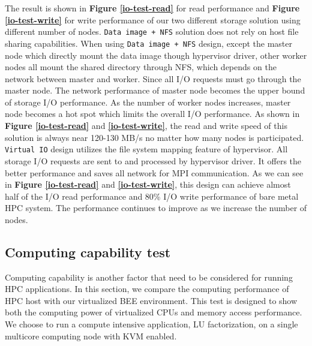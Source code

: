 The result is shown in \textbf{Figure \ref{io-test-read}} for read performance and \textbf{Figure \ref{io-test-write}} for write performance of our two different storage solution using different number of nodes. \texttt{Data image + NFS} solution does not rely on host file sharing capabilities. When using \texttt{Data image + NFS} design, except the master node which directly mount the data image though hypervisor driver, other worker nodes all mount the shared directory through NFS, which depends on the network between master and worker. Since all I/O requests must go through the master node. The network performance of master node becomes the upper bound of storage I/O performance. As the number of worker nodes increases, master node becomes a hot spot which limits the overall I/O performance.  As shown in \textbf{Figure \ref{io-test-read}} and \textbf{\ref{io-test-write}}, the read and write speed of this solution is always near 120-130 MB/s no matter how many nodes is participated. \texttt{Virtual IO} design utilizes the file system mapping feature of hypervisor. All storage I/O requests are sent to and processed by hypervisor driver. It offers the better performance and saves all network for MPI communication. As we can see in \textbf{Figure \ref{io-test-read}} and \textbf{\ref{io-test-write}}, this design can achieve almost half of the I/O read performance and 80\% I/O write performance of bare metal HPC system. The performance continues to improve as we increase the number of nodes.

\subsection{Computing capability test}
Computing capability is another factor that need to be considered for running HPC applications. In this section, we compare the computing performance of HPC host with our virtualized BEE environment. This test is designed to show both the computing power of virtualized CPUs and memory access performance.  We choose to run a compute intensive application, LU factorization, on a single multicore computing node with KVM enabled.

